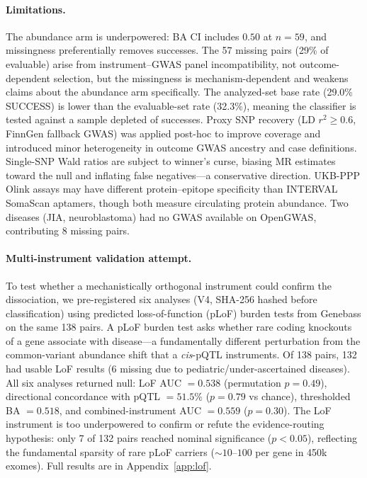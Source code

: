 \documentclass[11pt]{article}
\begin{document}
\paragraph{Limitations.}
The abundance arm is underpowered: BA CI includes $0.50$ at $n = 59$, and missingness preferentially removes successes. The 57 missing pairs (29\% of evaluable) arise from instrument--GWAS panel incompatibility, not outcome-dependent selection, but the missingness is mechanism-dependent and weakens claims about the abundance arm specifically. The analyzed-set base rate (29.0\% SUCCESS) is lower than the evaluable-set rate (32.3\%), meaning the classifier is tested against a sample depleted of successes. Proxy SNP recovery (LD $r^2 \geq 0.6$, FinnGen fallback GWAS) was applied post-hoc to improve coverage and introduced minor heterogeneity in outcome GWAS ancestry and case definitions. Single-SNP Wald ratios are subject to winner's curse, biasing MR estimates toward the null and inflating false negatives---a conservative direction. UKB-PPP Olink assays may have different protein--epitope specificity than INTERVAL SomaScan aptamers, though both measure circulating protein abundance. Two diseases (JIA, neuroblastoma) had no GWAS available on OpenGWAS, contributing 8 missing pairs.

\paragraph{Multi-instrument validation attempt.}
To test whether a mechanistically orthogonal instrument could confirm the dissociation, we pre-registered six analyses (V4, SHA-256 hashed before classification) using predicted loss-of-function (pLoF) burden tests from Genebass \cite{karczewski2022genebass} on the same 138 pairs. A pLoF burden test asks whether rare coding knockouts of a gene associate with disease---a fundamentally different perturbation from the common-variant abundance shift that a \emph{cis}-pQTL instruments. Of 138 pairs, 132 had usable LoF results (6 missing due to pediatric/under-ascertained diseases). All six analyses returned null: LoF AUC $= 0.538$ (permutation $p = 0.49$), directional concordance with pQTL $= 51.5\%$ ($p = 0.79$ vs chance), thresholded BA $= 0.518$, and combined-instrument AUC $= 0.559$ ($p = 0.30$). The LoF instrument is too underpowered to confirm or refute the evidence-routing hypothesis: only 7 of 132 pairs reached nominal significance ($p < 0.05$), reflecting the fundamental sparsity of rare pLoF carriers (${\sim}10$--$100$ per gene in 450k exomes). Full results are in Appendix~\ref{app:lof}.
\end{document}
